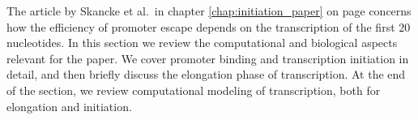 %
The article by Skancke et al.\ in chapter \ref{chap:initiation_paper} on page
\pageref{chap:initiation_paper} concerns how the efficiency of promoter escape
depends on the transcription of the first 20 nucleotides. In this section we
review the computational and biological aspects relevant for the paper. We
cover promoter binding and transcription initiation in detail, and then briefly
discuss the elongation phase of transcription. At the end of the section, we
review computational modeling of transcription, both for elongation and
initiation.
